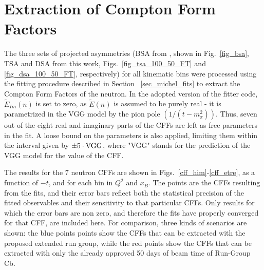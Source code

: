 \section{Extraction of Compton Form Factors}\label{sec_cff}
The three sets of projected asymmetries (BSA from \cite{proposal}, shown in Fig.~\ref{fig_bsa}, TSA and DSA from this work, Figs.~\ref{fig_tsa_100_50_FT} and \ref{fig_dsa_100_50_FT}, respectively) for all kinematic bins were processed using the fitting procedure described in Section ~\ref{sec_michel_fits} to extract the Compton Form Factors of the neutron.  
In the adopted version of the fitter code, $\tilde{E}_{Im}(n)$ is set to zero, as $\tilde{E}(n)$ is assumed to be purely real - it is parametrized in the VGG model by the pion pole $(1/(t-m^2_{\pi}))$. Thus, seven out of the eight real and imaginary parts of the CFFs are left as free parameters in the fit. A loose bound on the parameters is also applied, limiting them within the interval given by $\pm 5 \cdot {\rm VGG}$, where "VGG" stands for the prediction of the VGG model for the value of the CFF.


The results for the 7 neutron CFFs are shown in Figs.~\ref{cff_him}-\ref{cff_etre}, as a function of $-t$, and for each bin in $Q^2$ and $x_B$. The points are the CFFs resulting from the fits, and their error bars reflect both the statistical precision of the fitted observables and their sensitivity to that particular CFFs. Only results for which the error bars are non zero, and therefore the fits have properly converged for that CFF, are included here. For comparison, three kinds of scenarios are shown: the blue points points show the CFFs that can be extracted with the proposed extended run group, while the red points show the CFFs that can be extracted with only the already approved 50 days of beam time of Run-Group Cb. 

